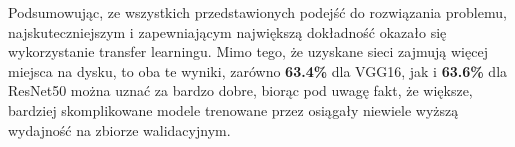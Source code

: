 Podsumowując, ze wszystkich przedstawionych podejść do rozwiązania problemu, najskuteczniejszym i zapewniającym największą dokładność okazało się wykorzystanie transfer learningu. Mimo tego, że uzyskane sieci zajmują więcej miejsca na dysku, to oba te wyniki, zarówno \textbf{63.4\%} dla VGG16, jak i \textbf{63.6\%} dla ResNet50 można uznać za bardzo dobre, biorąc pod uwagę fakt, że większe, bardziej skomplikowane modele trenowane przez \cite{GAD} osiągały niewiele wyższą wydajność na zbiorze walidacyjnym. 
